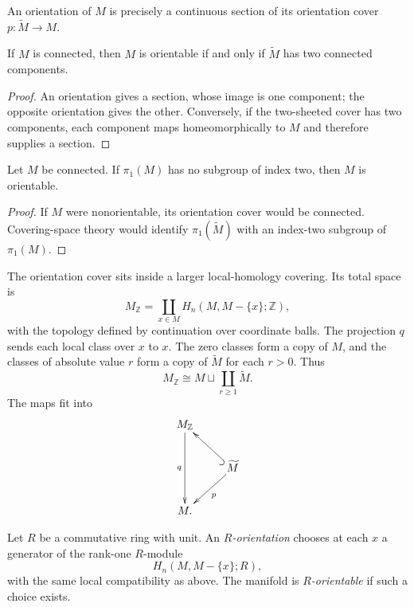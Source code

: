 \begin{remark}
\label{at-remark-orientation-section}
An orientation of $M$ is precisely a
continuous section of its orientation
cover $p:\widetilde M\to M$.
\end{remark}

\begin{corollary}
\label{at-lemma-cover-components}
If $M$ is connected, then $M$ is
orientable if and only if $\widetilde M$
has two connected components.
\end{corollary}

\begin{proof}
An orientation gives a section, whose image
is one component; the opposite orientation
gives the other.  Conversely, if the
two-sheeted cover has two components, each
component maps homeomorphically to $M$ and
therefore supplies a section.
\end{proof}

\begin{corollary}
\label{at-lemma-no-index-two}
Let $M$ be connected.  If $\pi_1(M)$ has
no subgroup of index two, then $M$ is
orientable.
\end{corollary}

\begin{proof}
If $M$ were nonorientable, its orientation
cover would be connected.  Covering-space
theory would identify
$\pi_1(\widetilde M)$ with an index-two
subgroup of $\pi_1(M)$.
\end{proof}

\noindent
The orientation cover sits inside a larger
local-homology covering.  Its total space is
$$
M_{\mathbb{Z}}
=
\coprod_{x\in M}
H_n(M,M-\{x\};\mathbb{Z}),
$$
with the topology defined by continuation
over coordinate balls.  The projection
$q$ sends each local class over $x$ to
$x$.  The zero classes form a copy of $M$,
and the classes of absolute value $r$ form
a copy of $\widetilde M$ for each $r>0$.
Thus
$$
M_{\mathbb{Z}}
\cong M\sqcup
\coprod_{r\geq 1}\widetilde M.
$$
The maps fit into
$$
\xymatrix{
M_{\mathbb{Z}}\ar[dd]_q \\
&\widetilde M
  \ar@{^{(}->}[ul]
  \ar[dl]^p \\
M.
}
$$

\begin{definition}
\label{at-definition-ring-orientation}
Let $R$ be a commutative ring with unit.
An \emph{$R$-orientation} chooses at each
$x$ a generator of the rank-one
$R$-module
$$
H_n(M,M-\{x\};R),
$$
with the same local compatibility as above.
The manifold is \emph{$R$-orientable} if
such a choice exists.
\end{definition}

